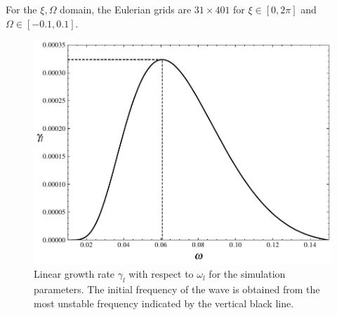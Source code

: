 \documentclass[times,12pt,3p,longtitle]{elsarticle}
\begin{document}
For the $\xi,\Omega$ domain, the Eulerian grids are $31 \times 401$ for $\xi \in [0,2\pi]$ and $\Omega \in [-0.1,0.1]$.
\begin{figure}[htbp]
    \centering
    \includegraphics[scale=0.5]{fig_gamma1d.pdf}
    \caption{Linear growth rate $\gamma_l$ with respect to $\omega_l$ for the simulation parameters. The initial frequency of the wave is obtained from the most unstable frequency indicated by the vertical black line.}
    \label{fig.para}
\end{figure}
\end{document}
